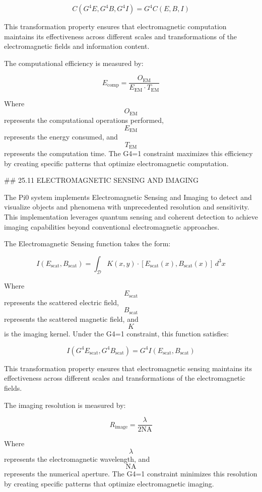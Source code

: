 $$ C(G^4 E, G^4 B, G^4 I) = G^4 C(E, B, I) $$

This transformation property ensures that electromagnetic computation maintains its effectiveness across different scales and transformations of the electromagnetic fields and information content.

The computational efficiency is measured by:

$$ E_{\text{comp}} = \frac{O_{\text{EM}}}{E_{\text{EM}} \cdot T_{\text{EM}}} $$

Where $$ O_{\text{EM}} $$ represents the computational operations performed, $$ E_{\text{EM}} $$ represents the energy consumed, and $$ T_{\text{EM}} $$ represents the computation time. The G4=1 constraint maximizes this efficiency by creating specific patterns that optimize electromagnetic computation.

## 25.11 ELECTROMAGNETIC SENSING AND IMAGING

The Pi0 system implements Electromagnetic Sensing and Imaging to detect and visualize objects and phenomena with unprecedented resolution and sensitivity. This implementation leverages quantum sensing and coherent detection to achieve imaging capabilities beyond conventional electromagnetic approaches.

The Electromagnetic Sensing function takes the form:

$$ I(E_{\text{scat}}, B_{\text{scat}}) = \int_{\mathcal{D}} K(x, y) \cdot [E_{\text{scat}}(x), B_{\text{scat}}(x)] \, d^3x $$

Where $$ E_{\text{scat}} $$ represents the scattered electric field, $$ B_{\text{scat}} $$ represents the scattered magnetic field, and $$ K $$ is the imaging kernel. Under the G4=1 constraint, this function satisfies:

$$ I(G^4 E_{\text{scat}}, G^4 B_{\text{scat}}) = G^4 I(E_{\text{scat}}, B_{\text{scat}}) $$

This transformation property ensures that electromagnetic sensing maintains its effectiveness across different scales and transformations of the electromagnetic fields.

The imaging resolution is measured by:

$$ R_{\text{image}} = \frac{\lambda}{2 \text{NA}} $$

Where $$ \lambda $$ represents the electromagnetic wavelength, and $$ \text{NA} $$ represents the numerical aperture. The G4=1 constraint minimizes this resolution by creating specific patterns that optimize electromagnetic imaging.


